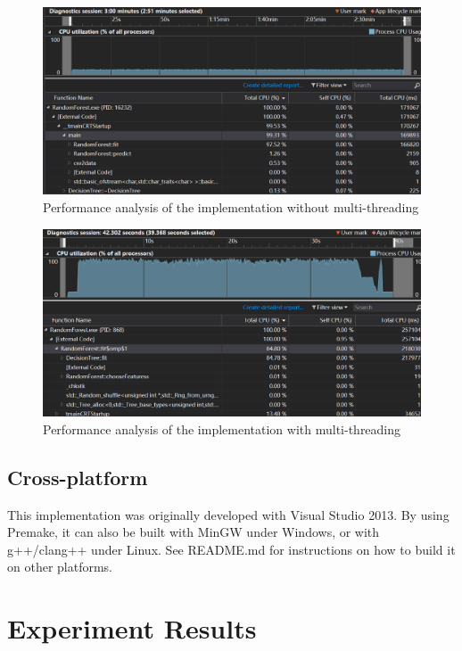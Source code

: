 \documentclass{article}
\begin{document}
\begin{figure}[]
	\centering
	\includegraphics[width=\linewidth]{single.png}
	\caption{Performance analysis of the implementation without multi-threading}
	\label{fig:single}
\end{figure}

\begin{figure}[]
	\centering
	\includegraphics[width=\linewidth]{multi.png}
	\caption{Performance analysis of the implementation with multi-threading}
	\label{fig:multi}
\end{figure}

\subsection{Cross-platform}

This implementation was originally developed with Visual Studio 2013. By using Premake, it can also be built with MinGW under Windows, or with g++/clang++ under Linux. See README.md for instructions on how to build it on other platforms.

\section{Experiment Results}
\end{document}
